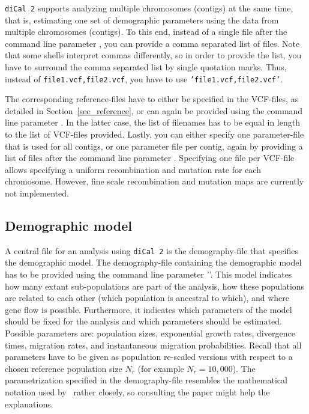 \documentclass{article}
\numberwithin{equation}{section}
\begin{document}
\texttt{diCal 2} supports analyzing multiple chromosomes (contigs) at the same time, that is, estimating one set of demographic parameters using the data from multiple chromosomes (contigs). To this end, instead of a single file after the command line parameter \texttt{}, you can provide a comma separated list of files. Note that some shells interpret commas differently, so in order to provide the list, you have to surround the comma separated list by single quotation marks. Thus, instead of \texttt{file1.vcf,file2.vcf}, you have to use \texttt{'file1.vcf,file2.vcf'}.

The corresponding reference-files have to either be specified in the VCF-files, as detailed in Section~\ref{sec_reference}, or can again be provided using the command line parameter \texttt{}. In the latter case, the list of filenames has to be equal in length to the list of VCF-files provided. Lastly, you can either specify one parameter-file that is used for all contigs, or one parameter file per contig, again by providing a list of files after the command line parameter \texttt{}. Specifying one file per VCF-file allows specifying a uniform recombination and mutation rate for each chromosome. However, fine scale recombination and mutation maps are currently not implemented.

\subsection{Demographic model}
\label{sec_demo}

A central file for an analysis using \texttt{diCal 2} is the demography-file that specifies the demographic model. The demography-file containing the demographic model has to be provided using the command line parameter '\texttt{}'. This model indicates how many extant sub-populations are part of the analysis, how these populations are related to each other (which population is ancestral to which), and where gene flow is possible. Furthermore, it indicates which parameters of the model should be fixed for the analysis and which parameters should be estimated. Possible parameters are: population sizes, exponential growth rates, divergence times, migration rates, and instantaneous migration probabilities. Recall that all parameters have to be given as population re-scaled versions with respect to a chosen reference population size $N_r$ (for example $N_r = 10,000$). The parametrization specified in the demography-file resembles the mathematical notation used by~\cite{Steinruecken2019} rather closely, so consulting the paper might help the explanations.
\end{document}
